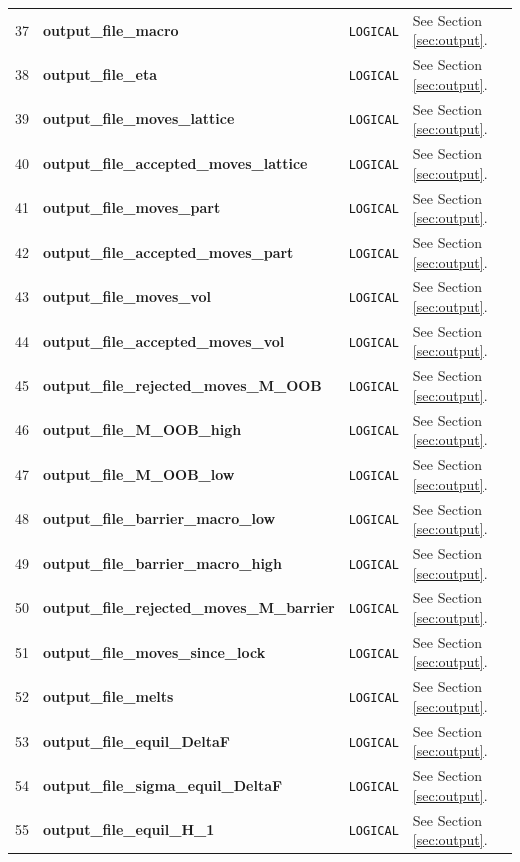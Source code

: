 \documentclass{report}
\begin{document}
\begin{landscape}
\begin{center}
\begin{longtable}{l l l p{8cm}}
37 & \textbf{output\_file\_macro}  &  \texttt{LOGICAL}  & See Section \ref{sec:output}. \\
38 & \textbf{output\_file\_eta}  &  \texttt{LOGICAL}  & See Section \ref{sec:output}. \\
39 & \textbf{output\_file\_moves\_lattice}  &  \texttt{LOGICAL}  & See Section \ref{sec:output}. \\
40 & \textbf{output\_file\_accepted\_moves\_lattice}  &  \texttt{LOGICAL}  & See Section \ref{sec:output}. \\
41 & \textbf{output\_file\_moves\_part}  &  \texttt{LOGICAL}  & See Section \ref{sec:output}. \\
42 & \textbf{output\_file\_accepted\_moves\_part}  &  \texttt{LOGICAL}  & See Section \ref{sec:output}. \\
43 & \textbf{output\_file\_moves\_vol}  &  \texttt{LOGICAL}  & See Section \ref{sec:output}. \\
44 & \textbf{output\_file\_accepted\_moves\_vol}  &  \texttt{LOGICAL}  & See Section \ref{sec:output}. \\
45 & \textbf{output\_file\_rejected\_moves\_M\_OOB}  &  \texttt{LOGICAL}  & See Section \ref{sec:output}. \\
46 & \textbf{output\_file\_M\_OOB\_high}  &  \texttt{LOGICAL}  & See Section \ref{sec:output}. \\
47 & \textbf{output\_file\_M\_OOB\_low}  &  \texttt{LOGICAL}  & See Section \ref{sec:output}. \\
48 & \textbf{output\_file\_barrier\_macro\_low}  &  \texttt{LOGICAL}  & See Section \ref{sec:output}. \\
49 & \textbf{output\_file\_barrier\_macro\_high}  &  \texttt{LOGICAL}  & See Section \ref{sec:output}. \\
50 & \textbf{output\_file\_rejected\_moves\_M\_barrier}  &  \texttt{LOGICAL}  & See Section \ref{sec:output}. \\
51 & \textbf{output\_file\_moves\_since\_lock}  &  \texttt{LOGICAL}  & See Section \ref{sec:output}. \\
52 & \textbf{output\_file\_melts}  &  \texttt{LOGICAL}  & See Section \ref{sec:output}. \\
53 & \textbf{output\_file\_equil\_DeltaF}  &  \texttt{LOGICAL}  & See Section \ref{sec:output}. \\
54 & \textbf{output\_file\_sigma\_equil\_DeltaF}  &  \texttt{LOGICAL}  & See Section \ref{sec:output}. \\
55 & \textbf{output\_file\_equil\_H\_1}  &  \texttt{LOGICAL}  & See Section \ref{sec:output}. \\

\end{longtable}
\end{center}
\end{landscape}
\end{document}
